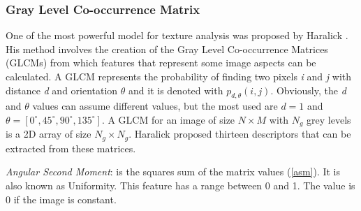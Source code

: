 \documentclass[final,a4paper,12pt,english]{UnicaPhdThesis3}
\begin{document}
\subsubsection{Gray Level Co-occurrence Matrix} \label{GLCM}
One of the most powerful model for texture analysis was proposed by Haralick \cite{Haralick}. His method involves the creation of the Gray Level Co-occurrence Matrices (\acs{GLCM}s) from which features that represent some image aspects can be calculated. A GLCM represents the probability of finding two pixels \textit{i} and \textit{j} with distance \textit{d} and orientation $\theta$ and it is denoted with $p_{d,\theta}(i,j)$. Obviously, the \textit{d} and $\theta$ values can assume different values, but the most used are $d = 1$ and $\theta = [0 ^\circ, 45 ^\circ, 90 ^\circ, 135 ^\circ]$. A GLCM for an image of size $N \times M$ with $N_{g}$ grey levels is a 2D array of size $N_{g} \times N_{g}$. Haralick proposed thirteen descriptors that can be extracted from these matrices. 

\noindent\textit{Angular Second Moment}: is the squares sum of the matrix values (\ref{asm}). It is also known as Uniformity. This feature has a range between 0 and 1. The value is 0 if the image is constant.
\end{document}
